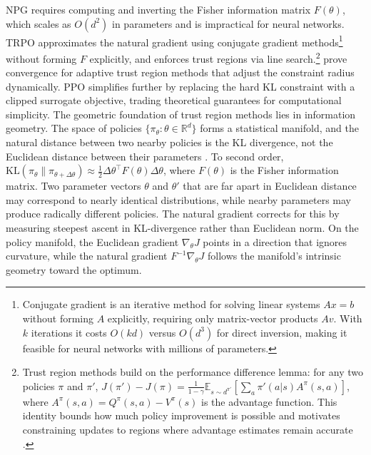 NPG requires computing and inverting the Fisher information matrix $F(\theta)$, which scales as $O(d^2)$ in parameters and is impractical for neural networks. TRPO \citep{Schulman2015} approximates the natural gradient using conjugate gradient methods\footnote{Conjugate gradient is an iterative method for solving linear systems $Ax = b$ without forming $A$ explicitly, requiring only matrix-vector products $Av$. With $k$ iterations it costs $O(kd)$ versus $O(d^3)$ for direct inversion, making it feasible for neural networks with millions of parameters.} without forming $F$ explicitly, and enforces trust regions via line search.\footnote{Trust region methods build on the performance difference lemma: for any two policies $\pi$ and $\pi'$, $J(\pi') - J(\pi) = \frac{1}{1-\gamma} \mathbb{E}_{s \sim d^{\pi'}} [ \sum_a \pi'(a|s) A^\pi(s,a) ]$, where $A^\pi(s,a) = Q^\pi(s,a) - V^\pi(s)$ is the advantage function. This identity bounds how much policy improvement is possible and motivates constraining updates to regions where advantage estimates remain accurate \citep{Kakade2002}.} \citet{shani2020} prove convergence for adaptive trust region methods that adjust the constraint radius dynamically. PPO \citep{Schulman2017} simplifies further by replacing the hard KL constraint with a clipped surrogate objective, trading theoretical guarantees for computational simplicity.
The geometric foundation of trust region methods lies in information geometry. The space of policies $\{\pi_\theta : \theta \in \mathbb{R}^d\}$ forms a statistical manifold, and the natural distance between two nearby policies is the KL divergence, not the Euclidean distance between their parameters \citep{amari1998natural}. To second order, $\mathrm{KL}(\pi_\theta \| \pi_{\theta + \Delta\theta}) \approx \frac{1}{2} \Delta\theta^\top F(\theta) \Delta\theta$, where $F(\theta)$ is the Fisher information matrix. Two parameter vectors $\theta$ and $\theta'$ that are far apart in Euclidean distance may correspond to nearly identical distributions, while nearby parameters may produce radically different policies. The natural gradient corrects for this by measuring steepest ascent in KL-divergence rather than Euclidean norm. On the policy manifold, the Euclidean gradient $\nabla_\theta J$ points in a direction that ignores curvature, while the natural gradient $F^{-1} \nabla_\theta J$ follows the manifold's intrinsic geometry toward the optimum.



